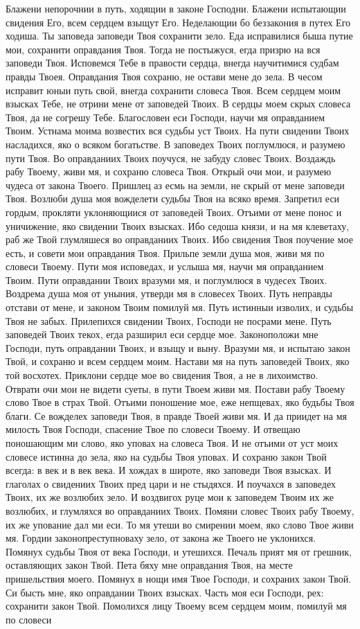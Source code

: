 Блажени непорочнии в путь, ходящии в законе Господни. Блажени испытающии свидения Его, всем сердцем взыщут Его. Неделающии бо беззакония в путех Его ходиша. Ты заповеда заповеди Твоя сохранити зело. Еда исправилися быша путие мои, сохранити оправдания Твоя. Тогда не постыжуся, егда призрю на вся заповеди Твоя. Исповемся Тебе в правости сердца, внегда научитимися судбам правды Твоея. Оправдания Твоя сохраню, не остави мене до зела. В чесом исправит юныи путь свой, внегда сохранити словеса Твоя. Всем сердцем моим взысках Тебе, не отрини мене от заповедей Твоих. В сердцы моем скрых словеса Твоя, да не согрешу Тебе. Благословен еси Господи, научи мя оправданием Твоим. Устнама моима возвестих вся судьбы уст Твоих. На пути свидении Твоих насладихся, яко о всяком богатьстве. В заповедех Твоих поглумлюся, и разумею пути Твоя. Во оправданиих Твоих поучуся, не забуду словес Твоих. Воздаждь рабу Твоему, живи мя, и сохраню словеса Твоя. Открый очи мои, и разумею чудеса от закона Твоего. Пришлец аз есмь на земли, не скрый от мене заповеди Твоя. Возлюби душа моя вожделети судьбы Твоя на всяко время. Запретил еси гордым, прокляти уклоняющиися от заповедей Твоих. Отъими от мене понос и уничижение, яко свидении Твоих взысках. Ибо седоша князи, и на мя клеветаху, раб же Твой глумляшеся во оправданиих Твоих. Ибо свидения Твоя поучение мое есть, и совети мои оправдания Твоя. Прильпе земли душа моя, живи мя по словеси Твоему. Пути моя исповедах, и услыша мя, научи мя оправданием Твоим. Пути оправдании Твоих вразуми мя, и поглумлюся в чудесех Твоих. Воздрема душа моя от уныния, утверди мя в словесех Твоих. Путь неправды отстави от мене, и законом Твоим помилуй мя. Путь истинныи изволих, и судьбы Твоя не забых. Прилепихся свидении Твоих, Господи не посрами мене. Путь заповедей Твоих текох, егда разширил еси сердце мое. Законоположи мне Господи, путь оправдании Твоих, и взыщу и выну. Вразуми мя, и испытаю закон Твой, и сохраню и всем сердцем моим. Настави мя на путь заповедей Твоих, яко той восхотех. Приклони сердце мое во свидения Твоя, а не в лихоимство. Отврати очи мои не видети суеты, в пути Твоем живи мя. Постави рабу Твоему слово Твое в страх Твой. Отъими поношение мое, еже непщевах, яко будьбы Твоя благи. Се вожделех заповеди Твоя, в правде Твоей живи мя. И да приидет на мя милость Твоя Господи, спасение Твое по словеси Твоему. И отвещаю поношающим ми слово, яко уповах на словеса Твоя. И не отъими от уст моих словесе истинна до зела, яко на судьбы Твоя уповах. И сохраню закон Твой всегда: в век и в век века. И хождах в широте, яко заповеди Твоя взысках. И глаголах о свидениих Твоих пред цари и не стыдяхся. И поучахся в заповедех Твоих, их же возлюбих зело. И воздвигох руце мои к заповедем Твоим их же возлюбих, и глумляхся во оправданиих Твоих. Помяни словес Твоих рабу Твоему, их же упование дал ми еси. То мя утеши во смирении моем, яко слово Твое живи мя. Гордии законопреступноваху зело, от закона же Твоего не уклонихся. Помянух судьбы Твоя от века Господи, и утешихся. Печаль прият мя от грешник, оставляющих закон Твой. Пета бяху мне оправдания Твоя, на месте пришельствия моего. Помянух в нощи имя Твое Господи, и сохраних закон Твой. Си бысть мне, яко оправдании Твоих взысках. Часть моя еси Господи, рех: сохранити закон Твой. Помолихся лицу Твоему всем сердцем моим, помилуй мя по словеси 